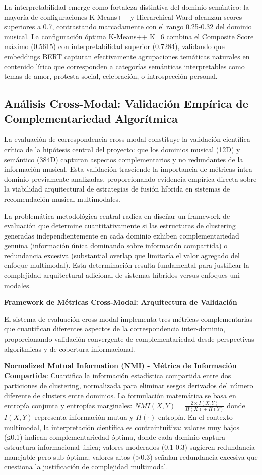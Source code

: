 \documentclass[12pt,a4paper]{report}
\begin{document}
La interpretabilidad emerge como fortaleza distintiva del dominio semántico: la mayoría de configuraciones K-Means++ y Hierarchical Ward alcanzan scores superiores a 0.7, contrastando marcadamente con el rango 0.25-0.32 del dominio musical. La configuración óptima K-Means++ K=6 combina el Composite Score máximo (0.5615) con interpretabilidad superior (0.7284), validando que embeddings BERT capturan efectivamente agrupaciones temáticas naturales en contenido lírico que corresponden a categorías semánticas interpretables como temas de amor, protesta social, celebración, o introspección personal.

\subsection{Análisis Cross-Modal: Validación Empírica de Complementariedad Algorítmica}

La evaluación de correspondencia cross-modal constituye la validación científica crítica de la hipótesis central del proyecto: que los dominios musical (12D) y semántico (384D) capturan aspectos complementarios y no redundantes de la información musical. Esta validación trasciende la importancia de métricas intra-dominio previamente analizadas, proporcionando evidencia empírica directa sobre la viabilidad arquitectural de estrategias de fusión híbrida en sistemas de recomendación musical multimodales.

La problemática metodológica central radica en diseñar un framework de evaluación que determine cuantitativamente si las estructuras de clustering generadas independientemente en cada dominio exhiben complementariedad genuina (información única dominando sobre información compartida) o redundancia excesiva (substantial overlap que limitaría el valor agregado del enfoque multimodal). Esta determinación resulta fundamental para justificar la complejidad arquitectural adicional de sistemas híbridos versus enfoques uni-modales.

\textbf{Framework de Métricas Cross-Modal: Arquitectura de Validación}

El sistema de evaluación cross-modal implementa tres métricas complementarias que cuantifican diferentes aspectos de la correspondencia inter-dominio, proporcionando validación convergente de complementariedad desde perspectivas algorítmicas y de cobertura informacional.

\textbf{Normalized Mutual Information (NMI) - Métrica de Información Compartida}: Cuantifica la información estadística compartida entre dos particiones de clustering, normalizada para eliminar sesgos derivados del número diferente de clusters entre dominios. La formulación matemática se basa en entropía conjunta y entropías marginales: $NMI(X,Y) = \frac{2 \times I(X,Y)}{H(X) + H(Y)}$ donde $I(X,Y)$ representa información mutua y $H(\cdot)$ entropía. En el contexto multimodal, la interpretación científica es contraintuitiva: valores muy bajos (≤0.1) indican complementariedad óptima, donde cada dominio captura estructura informacional única; valores moderados (0.1-0.3) sugieren redundancia manejable pero sub-óptima; valores altos (>0.3) señalan redundancia excesiva que cuestiona la justificación de complejidad multimodal.
\end{document}
